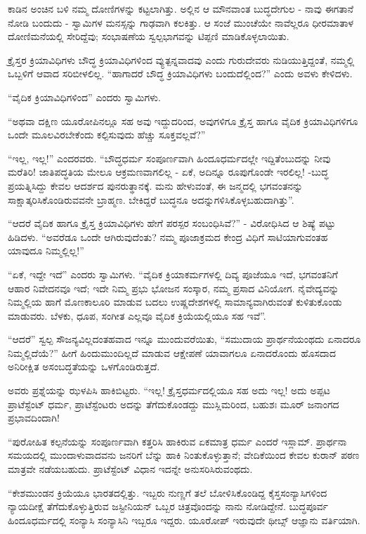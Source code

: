 ಕಾಡಿನ ಅಂಚಿನ ಬಳಿ ನಮ್ಮ ದೋಣಿಗಳನ್ನು ಕಟ್ಟಲಾಗಿತ್ತು. ಅಲ್ಲಿನ ಆ ಮೌನವಾಂತ ಬುದ್ಧದೇಗುಲ - ನಾವು ಈಗತಾನೆ ನೋಡಿ ಬಂದುದು - ಸ್ವಾಮಿಗಳ ಮನಸ್ಸನ್ನು ಗಾಢವಾಗಿ ಕಲಕಿತ್ತು. ಆ ಸಂಜೆ ಮುಂಚೆಯೇ ನಾವೆಲ್ಲರೂ ಧೀರಮಾತಾಳ ದೋಣಿಮನೆಯಲ್ಲಿ ಸೇರಿದ್ದೆವು; ಸಂಭಾಷಣೆಯ ಸ್ವಲ್ಪಭಾಗವನ್ನು ಟಿಪ್ಪಣಿ ಮಾಡಿಕೊಳ್ಳಲಾಯಿತು.

ಕ್ರೈಸ್ತರ ಕ್ರಿಯಾವಿಧಿಗಳು ಬೌದ್ಧ ಕ್ರಿಯಾವಿಧಿಗಳಿಂದ ವ್ಯುತ್ಪನ್ನವಾದವು ಎಂದು ಗುರುದೇವರು ನುಡಿಯುತ್ತಿದ್ದಂತೆ, ನಮ್ಮಲ್ಲಿ ಒಬ್ಬಳಿಗೆ ಆವಾದ ಸರಿಬೀಳಲಿಲ್ಲ. “ಹಾಗಾದರೆ ಬೌದ್ಧ ಕ್ರಿಯಾವಿಧಿಗಳು ಬಂದುದೆಲ್ಲಿಂದ?” ಎಂದು ಅವಳು ಕೇಳಿದಳು.

“ವೈದಿಕ ಕ್ರಿಯಾವಿಧಿಗಳಿಂದ” ಎಂದರು ಸ್ವಾಮಿಗಳು.

“ಅಥವಾ ದಕ್ಷಿಣ ಯೂರೋಪಿನಲ್ಲೂ ಸಹ ಅವು ಇದ್ದುದರಿಂದ, ಅವುಗಳಿಗೂ ಕ್ರೈಸ್ತ ಹಾಗೂ ವೈದಿಕ ಕ್ರಿಯಾವಿಧಿಗಳಿಗೂ ಒಂದೇ ಮೂಲವಿರಬೇಕೆಂದು ಕಲ್ಪಿಸುವುದು ಹೆಚ್ಚು ಸೂಕ್ತವಲ್ಲವೆ?”

“ಇಲ್ಲ, ಇಲ್ಲ!” ಎಂದರವರು. “ಬೌದ್ಧಧರ್ಮ ಸಂಪೂರ್ಣವಾಗಿ ಹಿಂದೂಧರ್ಮದಲ್ಲೇ ಇದ್ದಿತೆಂಬುದನ್ನು ನೀವು ಮರೆತಿರಿ! ಜಾತಿಪದ್ಧತಿಯ ಮೇಲೂ ಆಕ್ರಮಣವಾಗಲಿಲ್ಲ - ಏಕೆ, ಅದಿನ್ನೂ ರೂಪುಗೊಂಡೇ ಇರಲಿಲ್ಲ! -ಬುದ್ಧ ಪ್ರಯತ್ನಿಸಿದ್ದು ಕೇವಲ ಆದರ್ಶದ ಪುನರುತ್ಥಾನಕ್ಕೆ. ಮನು ಹೇಳುವಂತೆ, ಈ ಜನ್ಮದಲ್ಲಿ ಭಗವಂತನನ್ನು ಸಾಕ್ಷಾತ್ಕರಿಸಿಕೊಂಡಿರುವವನೇ ಬ್ರಾಹ್ಮಣ. ಬೇಕಿದ್ದರೆ ಬುದ್ಧನೂ ಅದನ್ನುಗಳಿಸಿಕೊಳ್ಳಬಹುದಾಗಿತ್ತು”.

“ಆದರೆ ವೈದಿಕ ಹಾಗೂ ಕ್ರೈಸ್ತ ಕ್ರಿಯಾವಿಧಿಗಳು ಹೇಗೆ ಪರಸ್ಪರ ಸಂಬಂಧಿಸಿವೆ?” - ವಿರೋಧಿಸಿದ ಆ ಶಿಷ್ಯೆ ಪಟ್ಟು ಹಿಡಿದಳು. “ಅವರೆಡೂ ಒಂದೇ ಆಗಿರುವುದೆಂತು? ನಮ್ಮ ಪೂಜಾಕ್ರಮದ ಕೇಂದ್ರ ವಿಧಿಗೆ ಸಾಟಿಯಾಗುವಂತಹ ಯಾವುದೂ ನಿಮ್ಮಲ್ಲಿಲ್ಲ!”

“ಏಕೆ, ಇದ್ದೇ ಇದೆ” ಎಂದರು ಸ್ವಾಮಿಗಳು. “ವೈದಿಕ ಕ್ರಿಯಾಕರ್ಮಗಳಲ್ಲಿ ದಿವ್ಯ ಪೂಜೆಯೂ ಇದೆ, ಭಗವಂತನಿಗೆ ಆಹಾರ ನಿವೇದನವೂ ಇದೆ; ಇದೇ ನಿಮ್ಮ ಪ್ರಭು ಭೋಜನ ಸಂಸ್ಕಾರ, ನಮ್ಮ ಪ್ರಸಾದ ವಿನಿಯೋಗ. ನೈವೇದ್ಯವನ್ನು ನಿಮ್ಮಲ್ಲಿಯ ಹಾಗೆ ಮೊಣಕಾಲೂರಿ ಮಾಡುವ ಬದಲು ಉಷ್ಣದೇಶಗಳಲ್ಲಿ ಸಾಮಾನ್ಯವಾಗಿರುವಂತೆ ಕುಳಿತುಕೊಂಡು ಮಾಡುವರು. ಬೆಳಕು, ಧೂಪ, ಸಂಗೀತ ಎಲ್ಲವೂ ವೈದಿಕ ಕ್ರಿಯೆಯಲ್ಲಿಯೂ ಸಹ ಇವೆ”.

“ಆದರೆ” ಸ್ವಲ್ಪ ಸೌಜನ್ಯವಿಲ್ಲದಂತಹವಾದ ಇನ್ನೂ ಮುಂದುವರೆಯಿತು, “ಸಮುದಾಯ ಪ್ರಾರ್ಥನೆಯಂಥದು ಏನಾದರೂ ನಿಮ್ಮಲ್ಲಿದೆಯೆ?” ಹೀಗೆ ಹಿಂದುಮುಂದಿಲ್ಲದೆ ಮಾಡುವ ಆಕ್ಷೇಪಣೆ ಯಾವಾಗಲೂ ಏನಾದರೊಂದು ಹೊಸದಾದ ಅನಿರೀಕ್ಷಿತ ಅಸಂಬದ್ಧತೆಯನ್ನು ಒಳಗೊಂಡಿರುತ್ತದೆ.

ಅವರು ಪ್ರಶ್ನೆಯನ್ನು ಝಳಪಿಸಿ ಹಾಕಿಬಿಟ್ಟರು. “ಇಲ್ಲ! ಕ್ರೈಸ್ತಧರ್ಮದಲ್ಲಿಯೂ ಸಹ ಅದು ಇಲ್ಲ! ಅದು ಅಪ್ಪಟ ಪ್ರಾಟೆಸ್ಟೆಂಟ್ ಧರ್ಮ, ಪ್ರಾಟೆಸ್ಟೆಂಟರು ಅದನ್ನು ತೆಗೆದುಕೊಂಡದ್ದು ಮುಸ್ಲಿಮರಿಂದ, ಬಹುಶಃ ಮೂರ್ ಜನಾಂಗದ ಪ್ರಭಾವದಿಂದಾಗಿ!

“ಪುರೋಹಿತ ಕಲ್ಪನೆಯನ್ನು ಸಂಪೂರ್ಣವಾಗಿ ಕತ್ತರಿಸಿ ಹಾಕಿರುವ ಏಕಮಾತ್ರ ಧರ್ಮ ಎಂದರೆ ಇಸ್ಲಾಮ್​. ಪ್ರಾರ್ಥನಾ ಸಮಯದಲ್ಲಿ ಮುಂದಾಳುವಾದವನು ಜನರಿಗೆ ಬೆನ್ನು ಹಾಕಿ ನಿಂತುಕೊಳ್ಳುತ್ತಾನೆ; ವೇದಿಕೆಯಿಂದ ಕೇವಲ ಕುರಾನ್ ಪಠಣ ಮಾತ್ರವೇ ನಡೆಯಬಹುದು. ಪ್ರಾಟೆಸ್ಟೆಂಟ್ ವಿಧಾನ ಇದನ್ನೇ ಅನುಸರಿಸಿರುವಂಥದು.

“ಕೇಶಮುಂಡನ ಕ್ರಿಯೆಯೂ ಭಾರತದಲ್ಲಿತ್ತು. ಇಬ್ಬರು ನುಣ್ಣಗೆ ತಲೆ ಬೋಳಿಸಿಕೊಂಡಿದ್ದ ಕೈಸ್ತಸಂನ್ಯಾಸಿಗಳಿಂದ ನ್ಯಾಯದೀಕ್ಷೆ ತೆಗೆದುಕೊಳ್ಳುತ್ತಿರುವ ಜಸ್ಟೀನಿಯನ್ ಒಬ್ಬರ ಚಿತ್ರವೊಂದನ್ನು ನಾನು ನೋಡಿದ್ದೇನೆ. ಬುದ್ಧಪೂರ್ವ ಹಿಂದೂಧರ್ಮದಲ್ಲಿ ಸಂನ್ಯಾಸಿ ಸಂನ್ಯಾಸಿನಿ ಇಬ್ಬರೂ ಇದ್ದರು. ಯೂರೋಪ್ ಇರುವುದೇ ಥೀಬ್ಸ್ ಆಜ್ಞಾನು ವರ್ತಿಯಾಗಿ.

